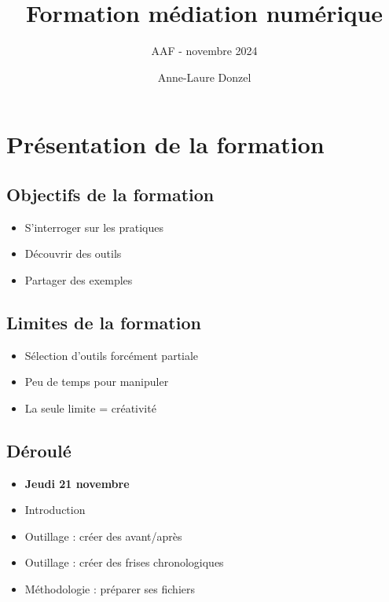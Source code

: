 \documentclass[
  letterpaper,
  DIV=11,
  numbers=noendperiod]{scrartcl}
\title{Formation médiation numérique}
\subtitle{AAF - novembre 2024}
\author{Anne-Laure Donzel}
\date{}
\providecommand{\tightlist}{%
  \setlength{\itemsep}{0pt}\setlength{\parskip}{0pt}}\usepackage{longtable,booktabs,array}
\begin{document}
\maketitle


\section{Présentation de la
formation}\label{pruxe9sentation-de-la-formation}

\subsection{Objectifs de la formation}\label{objectifs-de-la-formation}

\begin{itemize}
\tightlist
\item
  S'interroger sur les pratiques
\item
  Découvrir des outils
\item
  Partager des exemples
\end{itemize}

\subsection{Limites de la formation}\label{limites-de-la-formation}

\begin{itemize}
\tightlist
\item
  Sélection d'outils forcément partiale
\item
  Peu de temps pour manipuler
\item
  La seule limite = créativité
\end{itemize}

\subsection{Déroulé}\label{duxe9rouluxe9}

\begin{itemize}
\item
  \textbf{Jeudi 21 novembre}
\item
  Introduction
\item
  Outillage : créer des avant/après
\item
  Outillage : créer des frises chronologiques
\item
  Méthodologie : préparer ses fichiers
\end{itemize}
\end{document}
